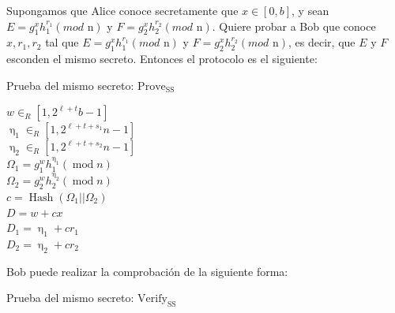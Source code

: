 Supongamos que Alice conoce secretamente que $x \in [0, b]$, y sean \\ $E = g_{1}^{x}h_{1}^{r_{1}} (mod \text{ n})$ y $F = g_{2}^{x}h_{2}^{r_{2}} (mod \text{ n})$. Quiere probar a Bob que conoce $x, r_{1}, r_{2}$ tal que $E = g_{1}^{x}h_{1}^{r_{1}} (mod \text{ n})$ y $F = g_{2}^{x}h_{2}^{r_{2}} (mod \text{ n})$, es decir, que $E$ y $F$ esconden el mismo secreto. Entonces el protocolo es el siguiente: \\
\begin{minipage}{0.9\textwidth}
    \begin{algorithm}[H] \label{alg:prove ss}
        \caption{Prueba del mismo secreto: $\operatorname{Prove_{SS}}$}

        $w \in_{R} [1, 2^{\ell+t}b-1]$ \\
        $\upeta_{1} \in_{R} [1, 2^{\ell+t+s_{1}}n-1]$ \\
        $\upeta_{2} \in_{R} [1, 2^{\ell+t+s_{2}}n-1]$ \\
        $\Omega_{1} = g_{1}^{w}h_{1}^{\upeta_{1}} (\operatorname{mod} n)$ \\
        $\Omega_{2} = g_{2}^{w}h_{2}^{\upeta_{2}} (\operatorname{mod} n)$ \\
        $c = \operatorname{Hash}(\Omega_{1} || \Omega_{2})$ \\
        $D = w + cx$ \\
        $D_{1} = \upeta_{1} + cr_{1}$ \\
        $D_{2} = \upeta_{2} + cr_{2}$ \\

    \end{algorithm}
\end{minipage}

Bob puede realizar la comprobación de la siguiente forma: \\
\begin{minipage}{0.9\textwidth}
    \begin{algorithm}[H] \label{alg:verify ss}
        \caption{Prueba del mismo secreto: $\operatorname{Verify_{SS}}$}
         
    \end{algorithm}
\end{minipage}

